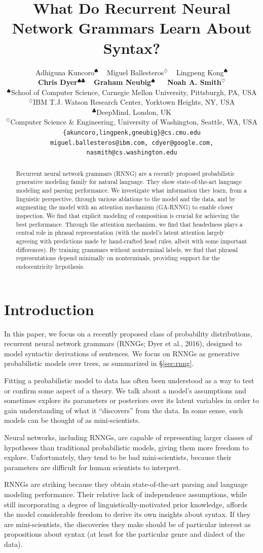 \documentclass[11pt]{article}
\title{What Do Recurrent Neural Network Grammars Learn About Syntax?}
\author{Adhiguna Kuncoro$^{\spadesuit}$ ~ Miguel Ballesteros$^{\diamondsuit}$  ~ Lingpeng Kong$^{\spadesuit}$  \\ 
\textbf{Chris Dyer}$^{\spadesuit\clubsuit}$ ~ \textbf{Graham Neubig}$^{\spadesuit}$ ~~ \textbf{Noah A. Smith}$^{\heartsuit}$ \\
$^{\spadesuit}$School of Computer Science, Carnegie Mellon University, Pittsburgh, PA, USA \\
$^{\diamondsuit}$IBM T.J. Watson Research Center, Yorktown Heights, NY, USA \\
$^{\clubsuit}$DeepMind, London, UK\\
$^{\heartsuit}$Computer Science \& Engineering, University of Washington, Seattle, WA, USA\\
{\small \tt \{akuncoro,lingpenk,gneubig\}@cs.cmu.edu}\\ {\small \tt miguel.ballesteros@ibm.com, cdyer@google.com, nasmith@cs.washington.edu}
}
\date{}
\begin{document}
\maketitle
\begin{abstract}
Recurrent neural network grammars (RNNG) are a recently proposed probabilistic generative modeling family for natural language. They show state-of-the-art language modeling and parsing performance. We investigate what information they learn, from a linguistic perspective, through various ablations to the model and the data, and by augmenting the model with an attention mechanism (GA-RNNG) to enable closer inspection. We find that explicit modeling of composition is crucial for achieving the best performance. Through the attention mechanism, we find that headedness plays a central role in phrasal representation (with the model's latent attention largely agreeing with predictions made by hand-crafted head rules, albeit with some important differences). By training grammars without nonterminal labels, we find that phrasal representations depend minimally on nonterminals, providing support for the endocentricity hypothesis. 
\end{abstract}

\section{Introduction}


In this paper, we focus on a recently proposed class of probability distributions,
recurrent neural network grammars (RNNGs; \nocite{rnng} Dyer et al., 2016), designed to model syntactic derivations of sentences.  We focus on RNNGs as generative probabilistic models over trees, as summarized in \S\ref{sec:rnng}.

Fitting a probabilistic model to data has often been understood as a way to test or confirm some aspect of a theory.  We talk about a model's assumptions and sometimes explore its parameters or posteriors over its latent variables in order to gain understanding of what it ``discovers'' from the data.  In some sense,  such models can be thought of as mini-scientists.

Neural networks, including RNNGs, are capable of representing larger classes of hypotheses than traditional probabilistic models, giving them more freedom to explore.  Unfortunately, they tend to be bad mini-scientists, because their parameters are difficult for human scientists to interpret.

RNNGs are striking because they obtain state-of-the-art parsing and language modeling performance.  Their relative lack of independence assumptions, while still incorporating a degree of linguistically-motivated prior knowledge, affords the model considerable freedom to derive its own insights about syntax. If they are mini-scientists, the discoveries they make should be of particular interest as propositions about syntax (at least for the particular genre and dialect of the data).
\end{document}
